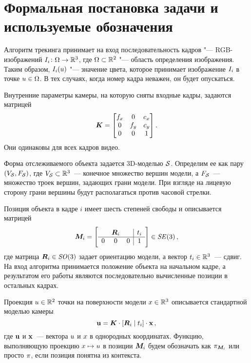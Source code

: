 \section{Формальная постановка задачи и используемые обозначения}\label{formalization}

Алгоритм трекинга принимает на вход последовательность кадров "---
RGB-изображений
$
    I_i \colon \Omega \to \mathbb{R}^3
$,
где $\Omega \subset \mathbb{R}^2$ "--- область определения изображения.
Таким образом, $I_i(\mathnormal{u})$ "--- значение цвета, которое принимает
изображение $I_i$ в точке $\mathnormal{u} \in \Omega$.
В тех случаях, когда номер кадра неважен, он будет опускаться.

Внутренние параметры камеры, на которую сняты входные кадры, задаются матрицей
\begin{equation}\label{eqn:camintr}
    \bm{K} = \begin{bmatrix}
        f_x & 0   & c_x \\
        0   & f_y & c_y \\
        0   & 0   & 1
    \end{bmatrix}
    \text{.}
\end{equation}
Они одинаковы для всех кадров видео.

Форма отслеживаемого объекта задается 3D-моделью $\mathcal{S}$.
Определим ее как пару $(V_{\mathcal{S}}, F_{\mathcal{S}})$, где
$V_{\mathcal{S}} \subset \mathbb{R}^3$~--- конечное множество вершин модели, а
$F_{\mathcal{S}}$~--- множество троек вершин, задающих грани модели.
При взгляде на лицевую сторону грани вершины будут располагаться против часовой
стрелки.

Позиция объекта в кадре $i$ имеет шесть степеней свободы и описывается матрицей
\begin{equation}\label{eqn:modelpose}
    \bm{M}_i = \left[ \begin{array}{ccc|c}
          & \bm{R}_i &   & \mathnormal{t}_i \\
        \hline
        0 & 0         & 0 & 1
    \end{array} \right] \in \mathit{SE}(3)
    \,\text{,}
\end{equation}
где матрица $\bm{R}_i \in \mathit{SO}(3)$ задает ориентацию модели, а вектор
$\mathnormal{t}_i \in \mathbb{R}^3$~--- сдвиг.
На вход алгоритма принимается положение объекта на начальном кадре,
а результатом его работы являются последовательно вычисленные позиции
в остальных кадрах.

Проекция $\mathnormal{u} \in \mathbb{R}^2$ точки на поверхности модели
$\mathnormal{x} \in \mathbb{R}^3$ описывается стандартной моделью камеры
\begin{equation}\label{eqn:proj}
    \mathbf{u} = \bm{K} \cdot [\bm{R}_i \mid \mathnormal{t}_i] \cdot \mathbf{x}
    \,\text{,}
\end{equation}
где $\mathbf{u}$ и $\mathbf{x}$~--- вектора $\mathnormal{u}$ и $\mathnormal{x}$ в однородных
координатах. Функцию, выполняющую проекцию $\mathnormal{x} \mapsto \mathnormal{u}$ в
позиции $\bm{M}_i$ будем обозначать как $\pi_{\bm{M}_i}$ или просто $\pi$,
если позиция понятна из контекста.

